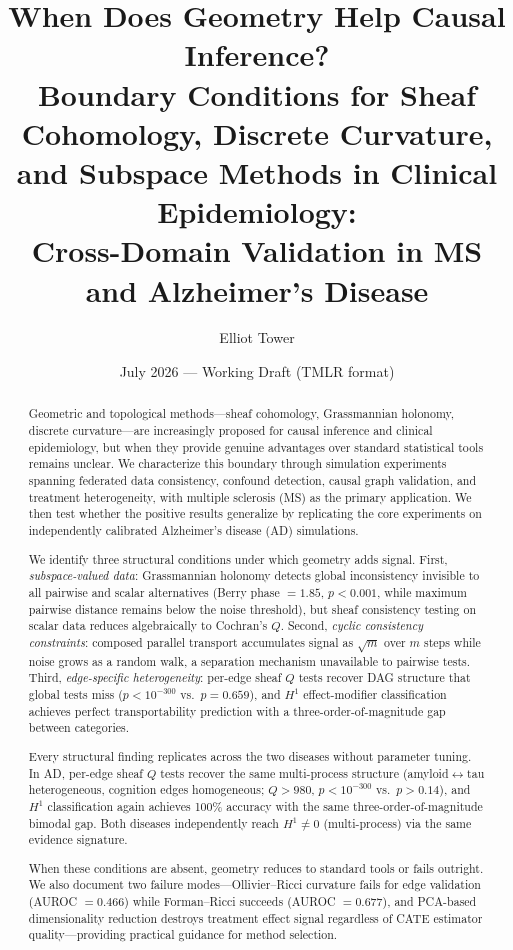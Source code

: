 \documentclass[11pt]{article}
\title{When Does Geometry Help Causal Inference?\\
Boundary Conditions for Sheaf Cohomology, Discrete Curvature,\\
and Subspace Methods in Clinical Epidemiology:\\
Cross-Domain Validation in MS and Alzheimer's Disease}
\author{
Elliot Tower
}
\date{July 2026 --- Working Draft (TMLR format)}
\begin{document}
\maketitle

\begin{abstract}
Geometric and topological methods---sheaf cohomology, Grassmannian holonomy, discrete curvature---are increasingly proposed for causal inference and clinical epidemiology, but when they provide genuine advantages over standard statistical tools remains unclear.
We characterize this boundary through simulation experiments spanning federated data consistency, confound detection, causal graph validation, and treatment heterogeneity, with multiple sclerosis (MS) as the primary application.
We then test whether the positive results generalize by replicating the core experiments on independently calibrated Alzheimer's disease (AD) simulations.

We identify three structural conditions under which geometry adds signal.
First, \emph{subspace-valued data}: Grassmannian holonomy detects global inconsistency invisible to all pairwise and scalar alternatives (Berry phase $= 1.85$, $p < 0.001$, while maximum pairwise distance remains below the noise threshold), but sheaf consistency testing on scalar data reduces algebraically to Cochran's $Q$.
Second, \emph{cyclic consistency constraints}: composed parallel transport accumulates signal as $\sqrt{m}$ over $m$ steps while noise grows as a random walk, a separation mechanism unavailable to pairwise tests.
Third, \emph{edge-specific heterogeneity}: per-edge sheaf $Q$ tests recover DAG structure that global tests miss ($p < 10^{-300}$ vs.\ $p = 0.659$), and $H^1$ effect-modifier classification achieves perfect transportability prediction with a three-order-of-magnitude gap between categories.

Every structural finding replicates across the two diseases without parameter tuning.
In AD, per-edge sheaf $Q$ tests recover the same multi-process structure (amyloid$\leftrightarrow$tau heterogeneous, cognition edges homogeneous; $Q > 980$, $p < 10^{-300}$ vs.\ $p > 0.14$), and $H^1$ classification again achieves 100\% accuracy with the same three-order-of-magnitude bimodal gap.
Both diseases independently reach $H^1 \neq 0$ (multi-process) via the same evidence signature.

When these conditions are absent, geometry reduces to standard tools or fails outright.
We also document two failure modes---Ollivier--Ricci curvature fails for edge validation (AUROC $= 0.466$) while Forman--Ricci succeeds (AUROC $= 0.677$), and PCA-based dimensionality reduction destroys treatment effect signal regardless of CATE estimator quality---providing practical guidance for method selection.
\end{abstract}
\end{document}
